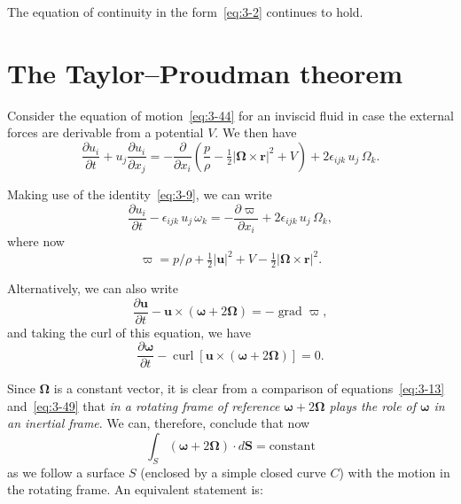 The equation of continuity in the form~\eqref{eq:3-2} continues to hold.

\section{The Taylor--Proudman theorem}\label{sec:3-22}
Consider the equation of motion~\eqref{eq:3-44} for an inviscid fluid in case the external forces are derivable from a potential $V$. We then have
\begin{equation}\label{eq:3-45}
\frac{\partial u_i}{\partial t} + u_j\frac{\partial u_i}{\partial x_j} = -\frac{\partial}{\partial x_i}\!\left(\frac{p}{\rho} - \tfrac{1}{2}|\boldsymbol{\Omega}\times\mathbf{r}|^2 + V\right) + 2\epsilon_{ijk}\, u_j\,\Omega_k.
\end{equation}

Making use of the identity~\eqref{eq:3-9}, we can write
\begin{equation}\label{eq:3-46}
\frac{\partial u_i}{\partial t} - \epsilon_{ijk}\, u_j\, \omega_k = -\frac{\partial\varpi}{\partial x_i} + 2\epsilon_{ijk}\, u_j\,\Omega_k,
\end{equation}
where now
\begin{equation}\label{eq:3-47}
\varpi = p/\rho + \tfrac{1}{2}|\mathbf{u}|^2 + V - \tfrac{1}{2}|\boldsymbol{\Omega}\times\mathbf{r}|^2.
\end{equation}

Alternatively, we can also write
\begin{equation}\label{eq:3-48}
\frac{\partial\mathbf{u}}{\partial t} - \mathbf{u}\times(\boldsymbol{\omega}+2\boldsymbol{\Omega}) = -\operatorname{grad}\varpi,
\end{equation}
and taking the curl of this equation, we have
\begin{equation}\label{eq:3-49}
\frac{\partial\boldsymbol{\omega}}{\partial t} - \operatorname{curl}[\mathbf{u}\times(\boldsymbol{\omega}+2\boldsymbol{\Omega})] = 0.
\end{equation}

Since $\boldsymbol{\Omega}$ is a constant vector, it is clear from a comparison of equations~\eqref{eq:3-13} and~\eqref{eq:3-49} that \emph{in a rotating frame of reference $\boldsymbol{\omega}+2\boldsymbol{\Omega}$ plays the role of\/ $\boldsymbol{\omega}$ in an inertial frame}. We can, therefore, conclude that now
\begin{equation}\label{eq:3-50}
\int_S (\boldsymbol{\omega}+2\boldsymbol{\Omega})\cdot d\mathbf{S} = \text{constant}
\end{equation}
as we follow a surface $S$ (enclosed by a simple closed curve $C$) with the motion in the rotating frame. An equivalent statement is:

